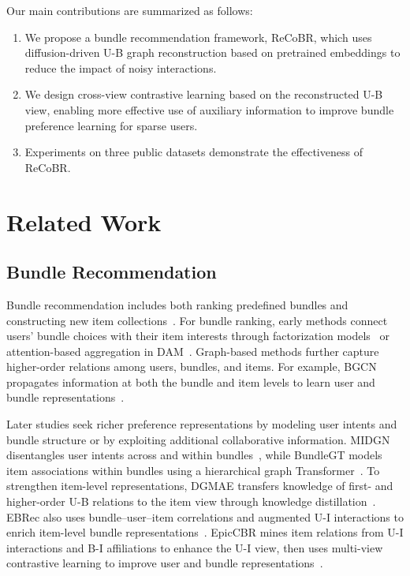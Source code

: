 \documentclass[letterpaper]{article}
\begin{document}
\newpage
Our main contributions are summarized as follows:

\begin{enumerate}
\item We propose a bundle recommendation framework, ReCoBR, which uses diffusion-driven U-B graph reconstruction based on pretrained embeddings to reduce the impact of noisy interactions.
\item We design cross-view contrastive learning based on the reconstructed U-B view, enabling more effective use of auxiliary information to improve bundle preference learning for sparse users.
\item Experiments on three public datasets demonstrate the effectiveness of ReCoBR.
\end{enumerate}

\section{Related Work}

\subsection{Bundle Recommendation}

Bundle recommendation includes both ranking predefined bundles and constructing new item collections~\cite{sun2024survey}. For bundle ranking, early methods connect users' bundle choices with their item interests through factorization models~\cite{cao2017efm} or attention-based aggregation in DAM~\cite{chen2019dam}. Graph-based methods further capture higher-order relations among users, bundles, and items. For example, BGCN propagates information at both the bundle and item levels to learn user and bundle representations~\cite{chang2020bgcn}.

Later studies seek richer preference representations by modeling user intents and bundle structure or by exploiting additional collaborative information. MIDGN disentangles user intents across and within bundles~\cite{zhao2022midgn}, while BundleGT models item associations within bundles using a hierarchical graph Transformer~\cite{wei2023bundlegt}. To strengthen item-level representations, DGMAE transfers knowledge of first- and higher-order U-B relations to the item view through knowledge distillation~\cite{ren2023dgmae}. EBRec also uses bundle--user--item correlations and augmented U-I interactions to enrich item-level bundle representations~\cite{du2025ebrec}. EpicCBR mines item relations from U-I interactions and B-I affiliations to enhance the U-I view, then uses multi-view contrastive learning to improve user and bundle representations~\cite{li2026epiccbr}.
\end{document}

